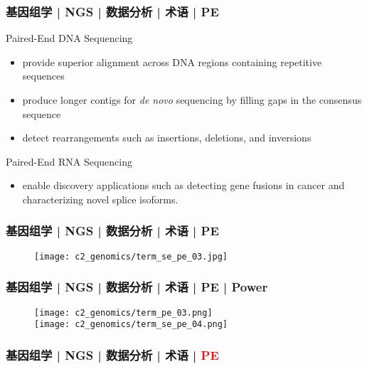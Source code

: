 \begin{frame}
  \frametitle{基因组学 | NGS | 数据分析 | 术语 | PE}
  \begin{block}{Paired-End DNA Sequencing}
    \begin{itemize}
      \item provide superior alignment across DNA regions containing repetitive sequences
      \item produce longer contigs for \textit{de novo} sequencing by filling gaps in the consensus sequence
      \item detect rearrangements such as insertions, deletions, and inversions
    \end{itemize}
  \end{block}
  \pause
  \begin{block}{Paired-End RNA Sequencing}
    \begin{itemize}
      \item enable discovery applications such as detecting gene fusions in cancer and characterizing novel splice isoforms.
    \end{itemize}
  \end{block}
\end{frame}

\begin{frame}
  \frametitle{基因组学 | NGS | 数据分析 | 术语 | PE}
  \begin{figure}
    \centering
    \texttt{[image: c2\_genomics/term\_se\_pe\_03.jpg]}
  \end{figure}
\end{frame}

\begin{frame}
  \frametitle{基因组学 | NGS | 数据分析 | 术语 | PE | Power}
  \begin{figure}
    \centering
    \texttt{[image: c2\_genomics/term\_pe\_03.png]}\\
    \vspace{1em}
    \texttt{[image: c2\_genomics/term\_se\_pe\_04.png]}
  \end{figure}
\end{frame}

\begin{frame}
  \frametitle{基因组学 | NGS | 数据分析 | 术语 | \textcolor{red}{PE}}
  \begin{figure}
    \centering
    \\
    \vspace{1em}
  \end{figure}
\end{frame}


